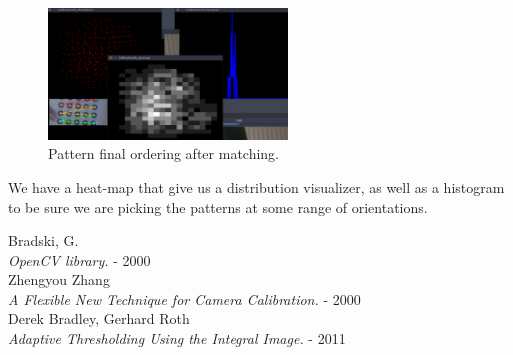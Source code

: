 \documentclass[journal]{IEEEtran}
\begin{document}
\begin{figure}[H]
\centering
\includegraphics[width=2.5in]{_img/tools.png}
\caption{Pattern final ordering after matching.}
\end{figure}

We have a heat-map that give us a distribution visualizer, as well as a histogram to be sure we are picking the patterns at some range of orientations. 


\begin{thebibliography}{1}

  Bradski, G. \\
  \textit{OpenCV library.} - 2000
\\
  Zhengyou Zhang \\
  \textit{A Flexible New Technique for Camera Calibration.} - 2000
\\
  Derek Bradley, Gerhard Roth \\
  \textit{Adaptive Thresholding Using the Integral Image.} - 2011

\end{thebibliography}
\end{document}
